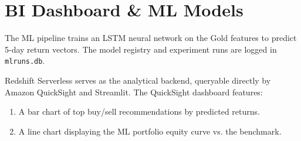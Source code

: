 \documentclass[11pt,a4paper]{article}
\begin{document}
\section{BI Dashboard \& ML Models}
The ML pipeline trains an LSTM neural network on the Gold features to predict 5-day return vectors. The model registry and experiment runs are logged in \texttt{mlruns.db}. 

Redshift Serverless serves as the analytical backend, queryable directly by Amazon QuickSight and Streamlit. The QuickSight dashboard features:
\begin{enumerate}
    \item A bar chart of top buy/sell recommendations by predicted returns.
    \item A line chart displaying the ML portfolio equity curve vs. the benchmark.
\end{enumerate}
\end{document}
